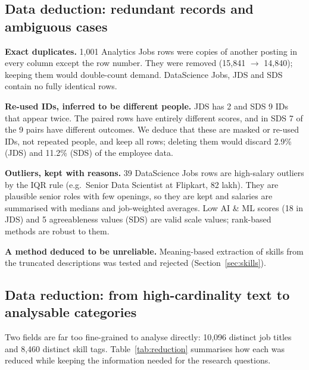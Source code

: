 \begin{table}[H]\centering\small
\caption{Distribution of the salary band (Analytics Jobs, 14,840 postings).}\label{tab:bands}

\end{table}

\subsection{Data deduction: redundant records and ambiguous cases}

\textbf{Exact duplicates.} 1,001 Analytics Jobs rows were copies of another posting in every column
except the row number. They were removed (15,841 $\rightarrow$ 14,840); keeping them would
double-count demand. DataScience Jobs, JDS and SDS contain no fully identical rows.

\textbf{Re-used IDs, inferred to be different people.} JDS has 2 and SDS 9 IDs that appear twice.
The paired rows have entirely different scores, and in SDS 7 of the 9 pairs have different outcomes.
We deduce that these are masked or re-used IDs, not repeated people, and keep all rows; deleting
them would discard 2.9\% (JDS) and 11.2\% (SDS) of the employee data.

\textbf{Outliers, kept with reasons.} 39 DataScience Jobs rows are high-salary outliers by the IQR
rule (e.g.\ Senior Data Scientist at Flipkart, 82 lakh). They are plausible senior roles with few
openings, so they are kept and salaries are summarised with medians and job-weighted averages.
Low AI \& ML scores (18 in JDS) and 5 agreeableness values (SDS) are valid scale values; rank-based
methods are robust to them.

\textbf{A method deduced to be unreliable.} Meaning-based extraction of skills from the truncated
descriptions was tested and rejected (Section~\ref{sec:skills}).

\subsection{Data reduction: from high-cardinality text to analysable categories}\label{sec:reduction}

Two fields are far too fine-grained to analyse directly: 10,096 distinct job titles and 8,460 distinct
skill tags. Table~\ref{tab:reduction} summarises how each was reduced while keeping the information
needed for the research questions.

